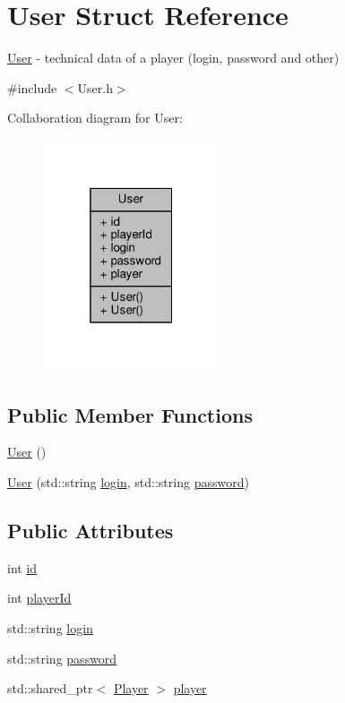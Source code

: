 \hypertarget{struct_user}{\section{User Struct Reference}
\label{struct_user}
}


\hyperlink{struct_user}{User} -\/ technical data of a player (login, password and other)  




{\ttfamily \#include $<$User.\-h$>$}



Collaboration diagram for User\-:
\nopagebreak
\begin{figure}[H]
\begin{center}
\leavevmode
\includegraphics[width=148pt]{struct_user__coll__graph}
\end{center}
\end{figure}
\subsection*{Public Member Functions}
\begin{DoxyCompactItemize}
\item 
\hyperlink{struct_user_a4a0137053e591fbb79d9057dd7d2283d}{User} ()
\item 
\hyperlink{struct_user_a074cc382f1a4178c6af5b8d7fdc505e7}{User} (std\-::string \hyperlink{struct_user_a68ef4336327a1ee8b4532a6042485f3a}{login}, std\-::string \hyperlink{struct_user_ac2f2e75b15e8eb6cbb030fc85a6cd59f}{password})
\end{DoxyCompactItemize}
\subsection*{Public Attributes}
\begin{DoxyCompactItemize}
\item 
int \hyperlink{struct_user_aa7e6e39b43020bbe9c3a196b3689b0f7}{id}
\item 
int \hyperlink{struct_user_add1a0a4d41bf6d364738b19f2cee96a6}{player\-Id}
\item 
std\-::string \hyperlink{struct_user_a68ef4336327a1ee8b4532a6042485f3a}{login}
\item 
std\-::string \hyperlink{struct_user_ac2f2e75b15e8eb6cbb030fc85a6cd59f}{password}
\item 
std\-::shared\-\_\-ptr$<$ \hyperlink{struct_player}{Player} $>$ \hyperlink{struct_user_a55d128918fa7d3e66120d392092227fd}{player}
\end{DoxyCompactItemize}


